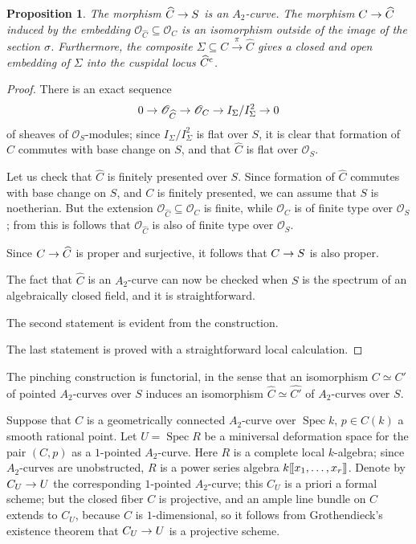 \documentclass[a4paper, 10pt]{amsart}
\numberwithin{equation}{section}
\numberwithin{subsection}{section}
\newtheorem{proposition}[theorem]{Proposition}
\theoremstyle{definition}
\theoremstyle{remark}
\renewcommand{\mathcal}{\mathscr}
\newcommand\cO{\mathcal{O}} \newcommand\cP{\mathcal{P}}
\newcommand\arr{\ifinner\to\else\longrightarrow\fi}
\newcommand{\xarr}{\xrightarrow}
\newcommand\spec{\operatorname{Spec}}
\newcommand{\ds}[1]{[\mspace{-2mu}[#1]\mspace{-2mu}]}
\newcommand{\cu}{^{\rm c}}
\begin{document}
	\begin{proposition}\label{prop:pinching}
		The morphism $\widehat{C} \arr S$ is an $A_2$-curve. The morphism $C \arr \widehat{C}$ induced by the embedding $\cO_{\widehat{C}} \subseteq \cO_{C}$ is an isomorphism outside of the image of the section $\sigma$. Furthermore, the composite $\Sigma \subseteq C \xarr{\pi} \widehat{C}$ gives a closed and open embedding of $\Sigma$ into the cuspidal locus $\widehat{C}\cu$.
	\end{proposition}
	
	\begin{proof}
		There is an exact sequence
		\[
		0 \arr \cO_{\widehat{C}} \arr \cO_{C} \arr I_{\Sigma}/I^{2}_{\Sigma} \arr 0
		\]
		of sheaves of $\cO_{S}$-modules; since $I_{\Sigma}/I^{2}_{\Sigma}$ is flat over $S$, it is clear that formation of $\widehat{C}$ commutes with base change on $S$, and that $\widehat{C}$ is flat over $\cO_{S}$.
		
		Let us check that $\widehat{C}$ is finitely presented over $S$. Since formation of $\widehat{C}$ commutes with base change on $S$, and $C$ is finitely presented, we can assume that $S$ is noetherian. But the extension $\cO_{\widehat{C}} \subseteq \cO_{C}$ is finite, while $\cO_{C}$ is of finite type over $\cO_{S}$; from this is follows that $\cO_{\widehat{C}}$ is also of finite type over $\cO_{S}$.
		
		Since $C \arr \widehat{C}$ is proper and surjective, it follows that $C\arr S$ is also proper. 
		
		The fact that $\widehat{C}$ is an $A_{2}$-curve can now be checked when $S$ is the spectrum of an algebraically closed field, and it is straightforward.
		
		
		The second statement is evident from the construction.
		
		The last statement is proved with a straightforward local calculation.
	\end{proof}
	
The pinching construction is functorial, in the sense that an isomorphism $C \simeq C'$ of pointed $A_{2}$-curves over $S$ induces an isomorphism $\widehat{C} \simeq \widehat{C'}$ of $A_{2}$-curves over $S$.

Suppose that $C$ is a geometrically connected $A_{2}$-curve over $\spec k$, $p \in C(k)$ a smooth rational point. Let $U = \spec R$ be a miniversal deformation space for the pair $(C,p)$ as a $1$-pointed $A_{2}$-curve. Here $R$ is a complete local $k$-algebra; since $A_{2}$-curves are unobstructed, $R$ is a power series algebra $k\ds{x_{1}, \dots, x_{r}}$. Denote by $C_{U} \arr U$ the corresponding $1$-pointed $A_{2}$-curve; this $C_{U}$ is a priori a formal scheme; but the closed fiber $C$ is projective, and an ample line bundle on $C$ extends to $C_{U}$, because $C$ is $1$-dimensional, so it follows from Grothendieck's existence theorem that $C_{U} \arr U$ is a projective scheme.
\end{document}
